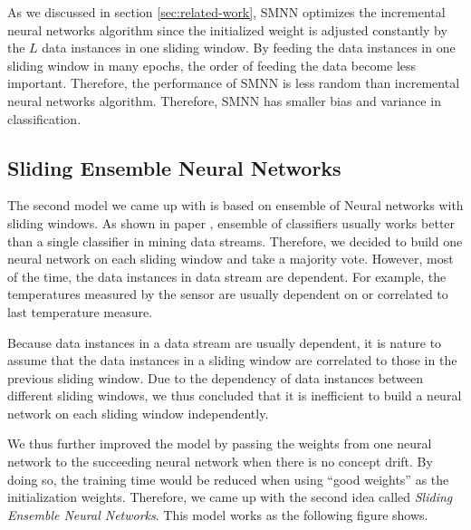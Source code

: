 \documentclass[conference]{IEEEtran}
\begin{document}
As we discussed in section \ref{sec:related-work}, SMNN optimizes the incremental neural networks algorithm since the initialized weight is adjusted constantly by the $L$ data instances in one sliding window. By feeding the data instances in one sliding window in many epochs, the order of feeding the data become less important. Therefore, the performance of SMNN is less random than incremental neural networks algorithm. Therefore, SMNN has smaller bias and variance in classification.


\subsection{Sliding Ensemble Neural Networks}
The second model we came up with is based on ensemble of Neural networks with sliding windows. As shown in paper \cite{ensemble1}, ensemble of classifiers usually works better than a single classifier in mining data streams. Therefore, we decided to build one neural network on each sliding window and take a majority vote. However, most of the time, the data instances in data stream are dependent. For example, the temperatures measured by the sensor are usually dependent on or correlated to last temperature measure.

Because data instances in a data stream are usually dependent, it is nature to assume that the data instances in a sliding window are correlated to those in the previous sliding window.  Due to the dependency of data instances between different sliding windows, we thus concluded that it is inefficient to build a neural network on each sliding window independently.   

We thus further improved the model by passing the weights from one neural network to the succeeding neural network when there is no concept drift. By doing so, the training time would be reduced when using ``good weights'' as the initialization weights.  Therefore, we came up with the second idea called \emph{Sliding Ensemble Neural Networks}. This model works as the following figure shows.

\end{document}
